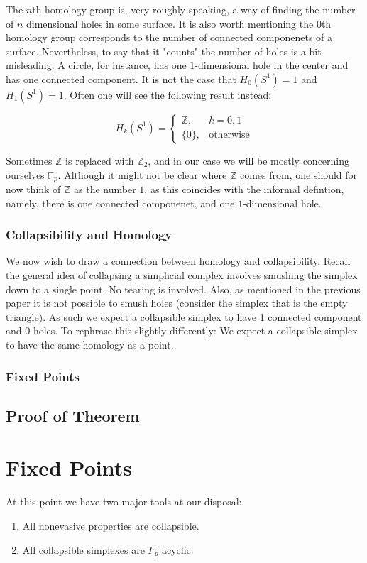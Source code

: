 \documentclass[letterpaper,12pt]{article}
\begin{document}
The $n$th homology group is, very roughly speaking, a way of finding the number of $n$ dimensional holes in some surface. It is also worth mentioning the $0$th homology group corresponds to the number of connected componenets of a surface. Nevertheless, to say that it "counts" the number of holes is a bit misleading. A circle, for instance, has one $1$-dimensional hole in the center and has one connected component. It is not the case that $H_0(S^1) = 1$ and $H_1(S^1) = 1$. Often one will see the following result instead:

$$H_k(S^1) =
\begin{cases}
    \mathbb{Z}, & k = 0, 1 \\
    \{ 0 \}, & \text{otherwise}
\end{cases}
$$

Sometimes $\mathbb{Z}$ is replaced with $\mathbb{Z}_2$, and in our case we will be mostly concerning ourselves $\mathbb{F}_p$. Although it might not be clear where $\mathbb{Z}$ comes from, one should for now think of $\mathbb{Z}$ as the number $1$, as this coincides with the informal defintion, namely, there is one connected componenet, and one $1$-dimensional hole.

\subsubsection{Collapsibility and Homology}

We now wish to draw a connection between homology and collapsibility. Recall the general idea of collapsing a simplicial complex involves smushing the simplex down to a single point. No tearing is involved. Also, as mentioned in the previous paper it is not possible to smush holes (consider the simplex that is the empty triangle). As such we expect a collapsible simplex to have 1 connected component and 0 holes. To rephrase this slightly differently: We expect a collapsible simplex to have the same homology as a point.

\subsubsection{Fixed Points}


\subsection{Proof of Theorem}

\section{Fixed Points}

At this point we have two major tools at our disposal:

\begin{enumerate}
    \item{
            All nonevasive properties are collapsible.
        }
    \item{
            All collapsible simplexes are $F_p$ acyclic.
        }
\end{enumerate}
\end{document}
